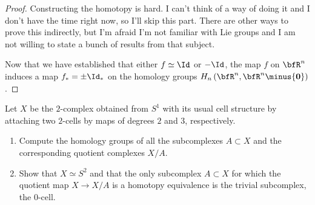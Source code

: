 \begin{proof}
Constructing the homotopy is hard. I can't think of a way of doing it and I
don't have the time right now, so I'll skip this part. There are other ways
to prove this indirectly, but I'm afraid I'm not familiar with Lie groups
and I am not willing to state a bunch of results from that subject.

Now that we have established that either $f\simeq \Id$ or $-\Id$, the map
$f$ on $\bfR^n$ induces a map $f_*=\pm\Id_*$ on the homology groups
$H_n\left(\bfR^n,\bfR^n\minus\{\mathbf{0}\}\right)$.
\end{proof}
\newpage

\begin{problem}[Hatcher {\S}2.2, Ex.\@ 13]
Let $X$ be the $2$-complex obtained from $S^1$ with its usual cell
structure by attaching two $2$-cells by maps of degrees $2$ and $3$,
respectively.
\begin{enumerate}[label=(\alph*)]
\item Compute the homology groups of all the subcomplexes $A\subset X$ and
  the corresponding quotient complexes $X/A$.
\item Show that $X\simeq S^2$ and that the only subcomplex $A\subset X$ for
  which the quotient map $X\to X/A$ is a homotopy equivalence is the
  trivial subcomplex, the $0$-cell.
\end{enumerate}
\end{problem}
